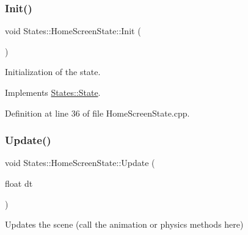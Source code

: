 \subsubsection{\texorpdfstring{Init()}{Init()}}
{\footnotesize\ttfamily void States\+::\+Home\+Screen\+State\+::\+Init (\begin{DoxyParamCaption}{ }\end{DoxyParamCaption})\hspace{0.3cm}{\ttfamily [virtual]}}



Initialization of the state. 

\begin{DoxyVerb}\end{DoxyVerb}
 

Implements \mbox{\hyperlink{class_states_1_1_state_aff396dd3b4f3f7f7e729a0eac1910f45}{States\+::\+State}}.



Definition at line 36 of file Home\+Screen\+State.\+cpp.


\begin{DoxyCode}{0}

\end{DoxyCode}
\mbox{\label{class_states_1_1_home_screen_state_a86c27b5c969563bb2d606cdecba1e949}} 
\subsubsection{\texorpdfstring{Update()}{Update()}}
{\footnotesize\ttfamily void States\+::\+Home\+Screen\+State\+::\+Update (\begin{DoxyParamCaption}\item[{float}]{dt }\end{DoxyParamCaption})\hspace{0.3cm}{\ttfamily [virtual]}}



Updates the scene (call the animation or physics methods here) 

